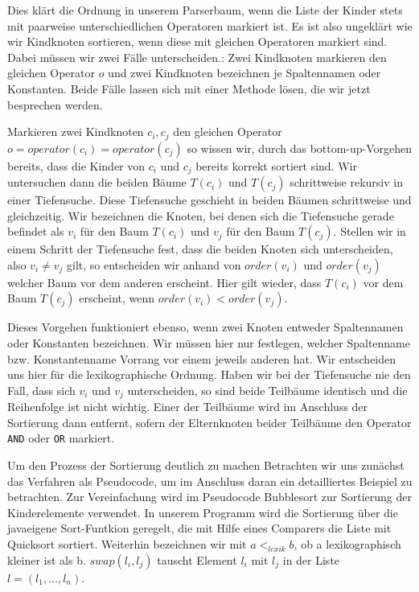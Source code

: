 Dies klärt die Ordnung in unserem Parserbaum, wenn die Liste der Kinder stets mit paarweise unterschiedlichen Operatoren markiert ist. Es ist also ungeklärt wie wir Kindknoten sortieren, wenn diese mit gleichen Operatoren markiert sind. Dabei müssen wir zwei Fälle unterscheiden.: Zwei Kindknoten markieren den gleichen Operator $o$ und zwei Kindknoten bezeichnen je Spaltennamen oder Konstanten. Beide Fälle lassen sich mit einer Methode lösen, die wir jetzt besprechen werden.

Markieren zwei Kindknoten $c_i,c_j$ den gleichen Operator $o = operator(c_i) = operator(c_j)$ so wissen wir, durch das bottom-up-Vorgehen bereits, dass die Kinder von $c_i$ und $c_j$ bereits korrekt sortiert sind. Wir untersuchen dann die beiden Bäume $T(c_i)$ und $T(c_j)$ schrittweise rekursiv in einer Tiefensuche. Diese Tiefensuche geschieht in beiden Bäumen schrittweise und gleichzeitig. Wir bezeichnen die Knoten, bei denen sich die Tiefensuche gerade befindet als $v_i$ für den Baum $T(c_i)$ und $v_j$ für den Baum $T(c_j)$. Stellen wir in einem Schritt der Tiefensuche fest, dass die beiden Knoten sich unterscheiden, also $v_i \neq v_j$ gilt, so entscheiden wir anhand von $order(v_i)$ und $order(v_j)$ welcher Baum vor dem anderen erscheint. Hier gilt wieder, dass $T(c_i)$ vor dem Baum $T(c_j)$ erscheint, wenn $order(v_i) < order(v_j)$. 

Dieses Vorgehen funktioniert ebenso, wenn zwei Knoten entweder Spaltennamen oder Konstanten bezeichnen. Wir müssen hier nur festlegen, welcher Spaltenname bzw. Konstantenname Vorrang vor einem jeweils anderen hat. Wir entscheiden uns hier für die lexikographische Ordnung. Haben wir bei der Tiefensuche nie den Fall, dass sich $v_i$ und $v_j$ unterscheiden, so sind beide Teilbäume identisch und die Reihenfolge ist nicht wichtig. Einer der Teilbäume wird im Anschluss der Sortierung dann entfernt, sofern der Elternknoten beider Teilbäume den Operator \verb|AND| oder \verb|OR| markiert.

Um den Prozess der Sortierung deutlich zu machen Betrachten wir uns zunächst das Verfahren als Pseudocode, um im Anschluss daran ein detailliertes Beispiel zu betrachten. Zur Vereinfachung wird im Pseudocode Bubblesort zur Sortierung der Kinderelemente verwendet. In unserem Programm wird die Sortierung über die javaeigene Sort-Funtkion geregelt, die mit Hilfe eines Comparers die Liste mit Quicksort sortiert. Weiterhin bezeichnen wir mit $a <_{lexik} b$, ob a lexikographisch kleiner ist als b. $swap(l_i,l_j)$ tauscht Element $l_i$ mit $l_j$ in der Liste $l=(l_1,...,l_n)$. 

